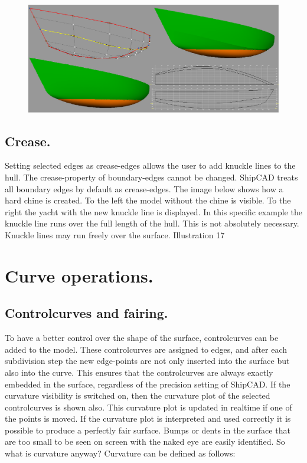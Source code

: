 \documentclass[12pt]{article}
\begin{document}
\begin{figure}[h]
        \centering
        \includegraphics[width=15cm,natwidth=1147,natheight=495]{creaseedge.png}
        \caption{}
        \label{fig:creaseedge}
\end{figure}

\subsection{Crease.}
Setting selected edges as crease-edges allows the user to add knuckle
lines to the hull. The crease-property of boundary-edges cannot be
changed. ShipCAD treats all boundary edges by default as
crease-edges. The image below shows how a hard chine is created. To
the left the model without the chine is visible. To the right the
yacht with the new knuckle line is displayed. In this specific example
the knuckle line runs over the full length of the hull. This is not
absolutely necessary. Knuckle lines may run freely over the surface.
Illustration 17

\pagebreak

\section{Curve operations.}

\subsection{Controlcurves and fairing.}
To have a better control over the shape of the surface, controlcurves
can be added to the model.  These controlcurves are assigned to edges,
and after each subdivision step the new edge-points are not only
inserted into the surface but also into the curve. This ensures that
the controlcurves are always exactly embedded in the surface,
regardless of the precision setting of ShipCAD. If the curvature
visibility is switched on, then the curvature plot of the selected
controlcurves is shown also. This curvature plot is updated in
realtime if one of the points is moved. If the curvature plot is
interpreted and used correctly it is possible to produce a perfectly
fair surface. Bumps or dents in the surface that are too small to be
seen on screen with the naked eye are easily identified.  So what is
curvature anyway? Curvature can be defined as follows:
\end{document}
